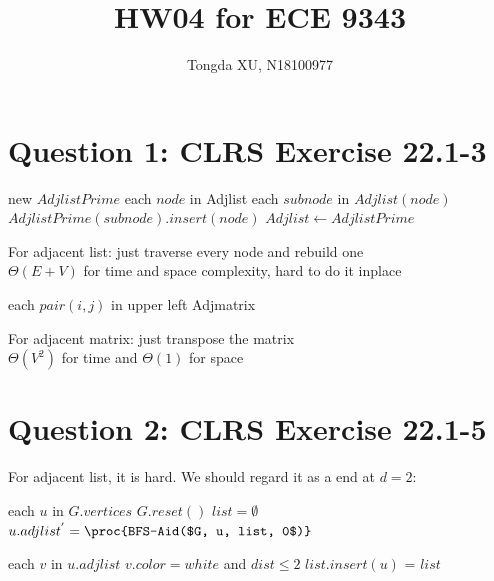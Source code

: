 \documentclass[]{article}
\title{HW04 for ECE 9343}
\author{Tongda XU, N18100977}
\begin{document}
\maketitle

\section{Question 1: CLRS Exercise 22.1-3}

\begin{codebox}
	\li new $AdjlistPrime$
	\li \For each $node$ in Adjlist
	\li		\Do \For each $subnode$ in $Adjlist(node)$
	\li 		\Do $AdjlistPrime(subnode).insert(node)$
	\li $Adjlist \gets AdjlistPrime$
	\End
\end{codebox}

For adjacent list: just traverse every node and rebuild one\\
$\Theta (E+V)$ for time and space complexity, hard to do it inplace\\

\begin{codebox}
	\li \For each $pair(i,j)$ in upper left Adjmatrix
	\li		\Do {}
	\End
\end{codebox}

For adjacent matrix: just transpose the matrix\\
$\Theta (V^2)$ for time and $\Theta(1)$ for space

\section{Question 2: CLRS Exercise 22.1-5}

For adjacent list, it is hard. We should regard it as a  end at $d = 2$:

\begin{codebox}
	
	\li \For each $u$ in $G.vertices$
	\li 	\Do $G.reset()$
	\li     $list = \emptyset$
	\li 	$u.adjlist^{'} = \proc{BFS-Aid($G, u, list, 0$)}$
	\End
	\End
\end{codebox}

\begin{codebox}
	
	\li \For each $v$ in $u.adjlist$
	\li 	\Do \If $v.color = white$ and $dist \le 2$ 
	\li			\Then $list.insert(u)$
	\li 		{}
	\End=
	\End
	\li \Return $list$
\end{codebox}
\end{document}
